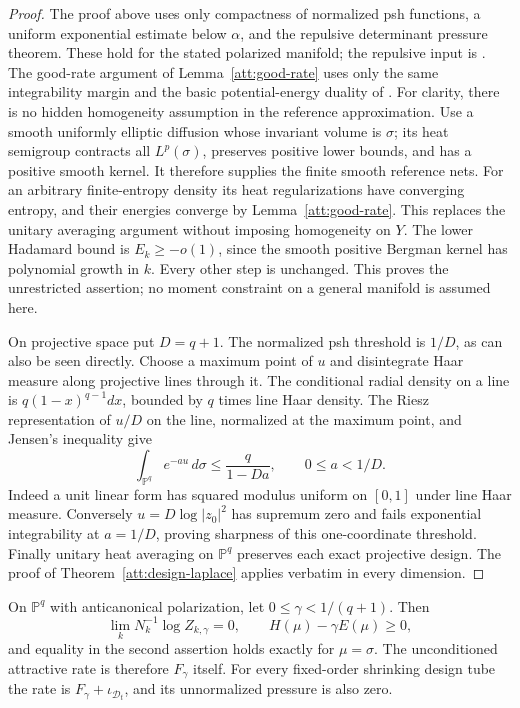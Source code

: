 \begin{proof}
The proof above uses only compactness of normalized psh functions,
a uniform exponential estimate below $\alpha$, and the repulsive determinant
pressure theorem. These hold for the stated polarized manifold; the
repulsive input is \cite[Theorem 5.7]{prob_berman2017}. The good-rate
argument of Lemma~\ref{att:good-rate} uses only the same integrability
margin and the basic potential-energy duality of \cite{BBGZ2013}.
For clarity, there is no hidden homogeneity assumption in the reference
approximation. Use a smooth uniformly elliptic diffusion whose invariant
volume is $\sigma$; its heat semigroup contracts all $L^p(\sigma)$,
preserves positive lower bounds, and has a positive smooth kernel.
It therefore supplies the finite smooth reference nets. For an arbitrary
finite-entropy density its heat regularizations have converging entropy,
and their energies converge by Lemma~\ref{att:good-rate}. This replaces
the unitary averaging argument without imposing homogeneity on $Y$. The lower
Hadamard bound is $E_k\ge-o(1)$, since the smooth positive Bergman kernel
has polynomial growth in $k$. Every other step is unchanged. This proves
the unrestricted assertion; no moment constraint on a general manifold
is assumed here.

On projective space put $D=q+1$. The normalized psh threshold is
$1/D$, as can also be seen directly. Choose a maximum point of $u$ and
disintegrate Haar measure along projective lines through it. The
conditional radial density on a line is $q(1-x)^{q-1}dx$, bounded by
$q$ times line Haar density. The Riesz representation of $u/D$ on the
line, normalized at the maximum point, and Jensen's inequality give
\[
 \int_{\mathbb P^q}e^{-au}\,d\sigma\le\frac{q}{1-Da},
 \qquad 0\le a<1/D.
\]
Indeed a unit linear form has squared modulus uniform on $[0,1]$ under
line Haar measure. Conversely $u=D\log|z_0|^2$ has supremum zero and
fails exponential integrability at $a=1/D$, proving sharpness of this
one-coordinate threshold. Finally unitary heat averaging on
$\mathbb P^q$ preserves each exact projective design. The proof of
Theorem~\ref{att:design-laplace} applies verbatim in every dimension.
\end{proof}

\begin{corollary}
\label{att:haar-minimizer}
On $\mathbb P^q$ with anticanonical polarization, let
$0\le\gamma<1/(q+1)$. Then
\[
 \lim_k N_k^{-1}\log Z_{k,\gamma}=0,
 \qquad H(\mu)-\gamma E(\mu)\ge0,
\]
and equality in the second assertion holds exactly for $\mu=\sigma$.
The unconditioned attractive rate is therefore $F_\gamma$ itself.
For every fixed-order shrinking design tube the rate is
$F_\gamma+\iota_{\mathcal D_t}$, and its unnormalized pressure is also
zero.
\end{corollary}

